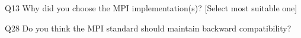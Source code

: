 \begin{description}%
\item{Q13} Why did you choose the MPI implementation(s)? [Select most suitable one]%
\item{Q28} Do you think the MPI standard should maintain backward compatibility?%
\end{description}%
